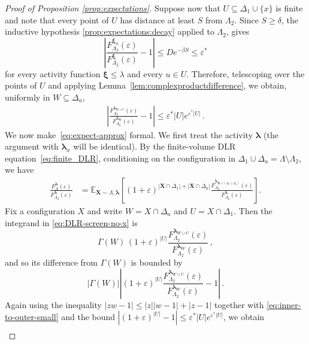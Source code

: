 \documentclass[10pt]{amsart}
\theoremstyle{definition}
\theoremstyle{remark}
\def\eps{{\varepsilon}}
\newcommand{\bX}{\mathbf{X}}
\newcommand{\E}{\mathbb{E}}
\newcommand{\region}{\Lambda}
\newcommand{\activity}{\lambda}
\newcommand{\activities}{\pmb{\lambda}}
\newcommand{\size}[1]{\left\lvert#1\right\rvert}
\newcommand{\absolute}[1]{\left\lvert#1\right\rvert}
\newcommand{\epsbound}{\varepsilon^{*}}
\begin{document}
\begin{proof}[Proof of Proposition \ref{prop:expectations}]
		Suppose now that \(U\subseteq \Delta_1\cup\{x\}\) is finite and note that every point of
		\(U\) has distance at least \(S\) from \(\region_2\). Since \(S\ge\delta\), the
		inductive hypothesis \ref{prop:expectations:decay} 
		applied to \(\region_2\), gives
		\[
		\left|
		\frac{
			F_{\region_2}^{\pmb{\xi}_u}(\varepsilon)}
		{F_{\region_2}^{\pmb{\xi}}(\varepsilon)}
		-1
		\right|
		\le
		D e^{-\beta S}\leq \epsbound
		\]
		for every activity function \(\pmb{\xi}\le\activity\) and every \(u\in U\).
		Therefore, telescoping over the points of \(U\) and applying
		Lemma~\ref{lem:complexproductdifference}, we obtain, uniformly in
		\(W\subseteq\Delta_a\),
		\begin{align}\label{eq:inner-to-outer-small}
			\absolute{
				\frac{F_{\region_2}^{\activities_{W\cup U}}(\varepsilon)}
				{F_{\region_2}^{\activities_W}(\varepsilon)}
				-1
			}
			\le
			\epsbound\absolute{U}
			e^{\epsbound\absolute{U}}\, .
		\end{align}
		We now make~\eqref{eq:expect-approx} formal.
		We first treat the activity \(\activities\) (the argument with \(\activities_x\) will be identical). By the finite-volume DLR equation~\eqref{eq:finite_DLR},
		conditioning on the configuration in
		\(\Delta_1\cup\Delta_a=\region\setminus\region_2\), we have
		\begin{align}\label{eq:DLR-screen-no-x}
			\frac{F_{\region}^{\activities}(\varepsilon)}
			{F_{\region_2}^{\activities}(\varepsilon)}
			&=
			\E_{\bX\sim\region,\activities}
			\left[
			(1+\varepsilon)^{\size{\bX\cap\Delta_1}
				+\absolute{\bX\cap\Delta_a}}
			\frac{F_{\region_2}^{\activities_{\bX\cap(\Delta_1\cup\Delta_a)}}(\varepsilon)}
			{F_{\region_2}^{\activities}(\varepsilon)}
			\right].
		\end{align}
		Fix a configuration \(X\) and write \(W=X\cap\Delta_a\) and \(U=X\cap\Delta_1\).
		Then the integrand in \eqref{eq:DLR-screen-no-x} is
		\[
		\Gamma(W)\,
		(1+\varepsilon)^{\absolute{U}}
		\frac{F_{\region_2}^{\activities_{W\cup U}}(\varepsilon)}
		{F_{\region_2}^{\activities_W}(\varepsilon)}\,  ,
		\]
		and so its difference from \(\Gamma(W)\) is bounded by
		\[
		|\Gamma(W)|
		\absolute{
			(1+\eps)^{\absolute{U}}
			\frac{F_{\region_2}^{\activities_{W\cup U}}(\varepsilon)}
			{F_{\region_2}^{\activities_W}(\varepsilon)}
			-1
		}\, .
		\]
		Again using the inequality $|zw-1|\leq |z||w-1|+|z-1|$
		together with \eqref{eq:inner-to-outer-small} and the bound
		\(
		|(1+\eps)^{\absolute{U}}-1|
		\le
		\epsbound\absolute{U}e^{\epsbound \absolute{U}}
		\), we obtain
		\begin{align*}

\end{align*}
\end{proof}
\end{document}
